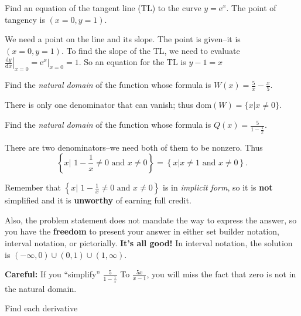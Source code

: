 \documentclass[12pt, answers,fleqn]{exam}
\newcommand{\dom}{\mbox{dom}}
\begin{document}
\begin{questions}
\begin{solution}
\end{solution}
\question Find an equation of the tangent line (TL) to the curve $y = \mathrm{e}^x$. 
The point of tangency is $(x= 0, y=1)$.
\begin{solution}
    We need a point on the line and its slope.  The point is given--it is \mbox{$(x= 0, y=1)$}.
    To find the slope of the TL, we need to evaluate $\displaystyle
    \left. \frac{\mathrm{d}y}{\mathrm{d}x} \right \vert_{x=0} = 
    \left. \mathrm{e}^x \right \vert_{x=0}  = 1.$ So an equation for the 
    TL is $y-1 = x$
    
\end{solution}

\question Find the \emph{natural domain} of the function whose formula is $W(x) = \frac{5}{x} - \frac{x}{5}$.
\begin{solution}
    There is only one denominator that can vanish; thus
    \mbox{\(
     \dom(W) = \{x | x \neq 0 \}.
    \)}
    
\end{solution}

\question Find the \emph{natural domain} of the function whose formula is 
$Q(x) = \frac{5}{1 - \frac{1}{x}} $.
\begin{solution}
    There are two denominators--we need both of them to be nonzero. Thus
    \[
         \left \{x |  \,\,  1 - \frac{1}{x} \neq 0 \mbox{ and } x \neq 0 \right \}
       =  \left \{x |   x \neq 1 \mbox{ and } x \neq 0 \right \}.
    \]

    Remember that \(\left \{x |  \,\,  1 - \frac{1}{x} \neq 0 \mbox{ and } x \neq 0  \right \} \)
    is in \emph{implicit form}, so it is \textbf{not} simplified and it
    is \textbf{unworthy} of earning full credit.

    \quad Also, the problem statement does not mandate the way to express 
    the answer, so you have the \textbf{freedom} to present your
    answer in either set builder notation, interval notation, or pictorially.
    \textbf{It's all good!} In interval notation, the solution is \((-\infty,0) \cup (0,1) \cup (1,\infty) \).


    \textbf{Careful:} If you ``simplify'' $\frac{5}{1 - \frac{1}{x}}$ To
    $\frac{5x}{x - 1}$, you will miss the fact that zero is 
    not in the natural domain.  
\end{solution}
\question Find each derivative

\end{questions}
\end{document}
